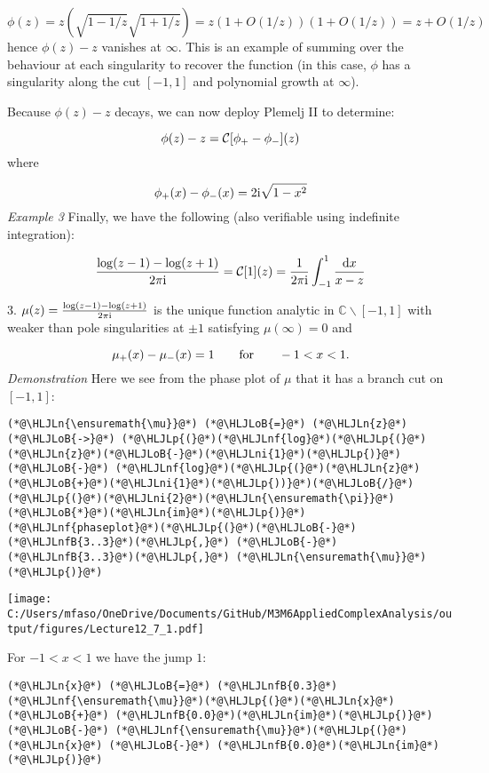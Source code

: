 \documentclass[12pt,landscape]{article}
\newcommand{\HLJLn}[1]{#1}
\newcommand{\HLJLnf}[1]{\textcolor[RGB]{66,102,213}{#1}}
\newcommand{\HLJLnfB}[1]{\textcolor[RGB]{59,151,46}{#1}}
\newcommand{\HLJLni}[1]{\textcolor[RGB]{59,151,46}{#1}}
\newcommand{\HLJLoB}[1]{\textcolor[RGB]{102,102,102}{\textbf{#1}}}
\newcommand{\HLJLp}[1]{#1}
\def\qqfor{\qquad\hbox{for}\qquad}
\def\D{ {\rm d} }
\def\I{ {\rm i} }
\def\C{ {\mathbb C} }
\def\CC{ {\cal C} }
\def\dx{\D x}
\def\cent#1{\begin{center}#1\end{center} }
\begin{document}
{\[
\phi(z) = z (\sqrt{1-{1/z}}\sqrt{1 + {1/z}}) = z (1 + O({1/z}))(1+O(1/z)) = z + O(1/z)
\]
hence $\phi(z) - z$ vanishes at $\infty$. This is an example of summing over the behaviour at each singularity to recover the function (in this case, $\phi$ has a singularity along the cut $[-1,1]$ and polynomial growth at $\infty$).

Because $\phi(z)-z$ decays, we can now deploy Plemelj II to determine:

\[
\phi(z) -z = \CC[\phi_+-\phi_-](z)
\]
where

\[
\phi_+(x) - \phi_-(x) = 2\I \sqrt{1-x^2}
\]
\emph{Example 3} Finally, we have the following (also verifiable using indefinite integration):

\[
{\log(z-1) - \log(z+1) \over 2 \pi \I} =  {\cal C}[1](z) = {1 \over 2 \pi \I} \int_{-1}^1 {\dx \over x -z}
\]


3. $\mu(z) = {\log(z -1) - \log(z+1) \over 2 \pi \I}$ is the unique function analytic in $\C \backslash [-1,1]$ with weaker than pole singularities at $\pm 1$ satisfying $\mu(\infty) = 0$ and

\[
\mu_+(x) - \mu_-(x) = 1 \qqfor -1 < x < 1.
\]
\emph{Demonstration} Here we see from the phase plot of $\mu$ that it has a branch cut on $[-1,1]$:


\begin{lstlisting}
(*@\HLJLn{\ensuremath{\mu}}@*) (*@\HLJLoB{=}@*) (*@\HLJLn{z}@*) (*@\HLJLoB{->}@*) (*@\HLJLp{(}@*)(*@\HLJLnf{log}@*)(*@\HLJLp{(}@*)(*@\HLJLn{z}@*)(*@\HLJLoB{-}@*)(*@\HLJLni{1}@*)(*@\HLJLp{)}@*) (*@\HLJLoB{-}@*) (*@\HLJLnf{log}@*)(*@\HLJLp{(}@*)(*@\HLJLn{z}@*)(*@\HLJLoB{+}@*)(*@\HLJLni{1}@*)(*@\HLJLp{))}@*)(*@\HLJLoB{/}@*)(*@\HLJLp{(}@*)(*@\HLJLni{2}@*)(*@\HLJLn{\ensuremath{\pi}}@*)(*@\HLJLoB{*}@*)(*@\HLJLn{im}@*)(*@\HLJLp{)}@*)
(*@\HLJLnf{phaseplot}@*)(*@\HLJLp{(}@*)(*@\HLJLoB{-}@*)(*@\HLJLnfB{3..3}@*)(*@\HLJLp{,}@*) (*@\HLJLoB{-}@*)(*@\HLJLnfB{3..3}@*)(*@\HLJLp{,}@*) (*@\HLJLn{\ensuremath{\mu}}@*)(*@\HLJLp{)}@*)
\end{lstlisting}
\newpage
\cent{\texttt{[image: C:/Users/mfaso/OneDrive/Documents/GitHub/M3M6AppliedComplexAnalysis/output/figures/Lecture12\_7\_1.pdf]}}

For $-1 < x < 1$ we have the jump $1$:


\begin{lstlisting}
(*@\HLJLn{x}@*) (*@\HLJLoB{=}@*) (*@\HLJLnfB{0.3}@*)
(*@\HLJLnf{\ensuremath{\mu}}@*)(*@\HLJLp{(}@*)(*@\HLJLn{x}@*) (*@\HLJLoB{+}@*) (*@\HLJLnfB{0.0}@*)(*@\HLJLn{im}@*)(*@\HLJLp{)}@*) (*@\HLJLoB{-}@*) (*@\HLJLnf{\ensuremath{\mu}}@*)(*@\HLJLp{(}@*)(*@\HLJLn{x}@*) (*@\HLJLoB{-}@*) (*@\HLJLnfB{0.0}@*)(*@\HLJLn{im}@*)(*@\HLJLp{)}@*)
\end{lstlisting}

}
\end{document}

